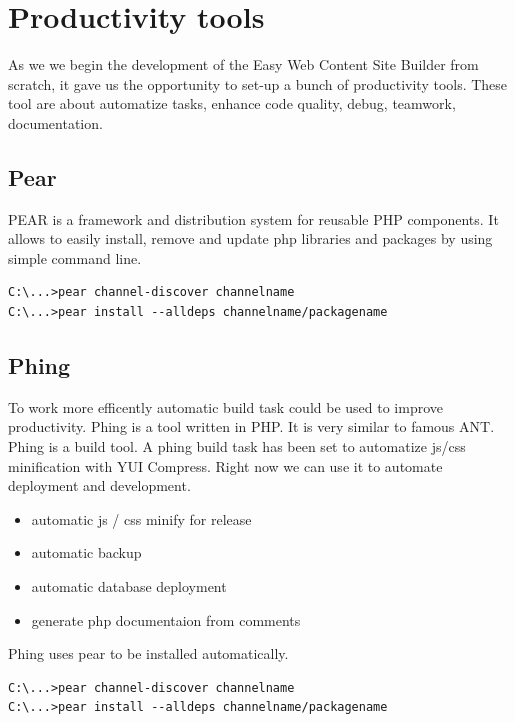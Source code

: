 \chapter{Productivity tools}
As we we begin the development of the Easy Web Content Site Builder from scratch, it gave us the opportunity to set-up a bunch of productivity tools. These tool are about automatize tasks, enhance code quality, debug, teamwork, documentation.
\section{Pear}

PEAR is a framework and distribution system for reusable PHP components. It allows to easily install, remove and update php libraries and packages by using simple command line.
\\

\lstset{language=bash}
\begin{lstlisting}[label=pear-install,caption=Installation of pear packages]
C:\...>pear channel-discover channelname
C:\...>pear install --alldeps channelname/packagename
\end{lstlisting}

\section{Phing}

To work more efficently automatic build task could be used to improve productivity. Phing is a tool written in PHP. It is very similar to famous ANT.
Phing is a build tool. A phing build task has been set to automatize js/css minification with YUI Compress.
Right now we can use it to automate deployment and development.
\begin{itemize}
\item automatic js / css minify for release
\item automatic backup
\item automatic database deployment
\item generate php documentaion from comments
\end{itemize}

Phing uses pear to be installed automatically.

\lstset{language=bash}
\begin{lstlisting}[label=phing-install,caption=Installation of Phing]
C:\...>pear channel-discover channelname
C:\...>pear install --alldeps channelname/packagename
\end{lstlisting}

